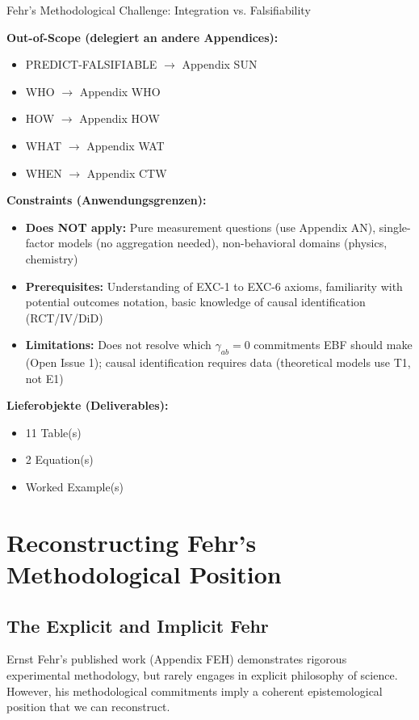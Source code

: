 \begin{chapter}{Fehr's Methodological Challenge: Integration vs. Falsifiability}
\begin{tcolorbox}[
    colback=orange!5!white,
    colframe=orange!75!black,
    title={\textbf{Appendix Scope: Ziel / In-Scope / Out-of-Scope / Constraints}},
    fonttitle=\bfseries
]
\textbf{Out-of-Scope (delegiert an andere Appendices):}
\begin{itemize}[nosep]
    \item PREDICT-FALSIFIABLE $\rightarrow$ Appendix SUN
    \item WHO $\rightarrow$ Appendix WHO
    \item HOW $\rightarrow$ Appendix HOW
    \item WHAT $\rightarrow$ Appendix WAT
    \item WHEN $\rightarrow$ Appendix CTW
\end{itemize}

\textbf{Constraints (Anwendungsgrenzen):}
\begin{itemize}[nosep]
    \item \textbf{Does NOT apply:} Pure measurement questions (use Appendix AN), single-factor models (no aggregation needed), non-behavioral domains (physics, chemistry)
    \item \textbf{Prerequisites:} Understanding of EXC-1 to EXC-6 axioms, familiarity with potential outcomes notation, basic knowledge of causal identification (RCT/IV/DiD)
    \item \textbf{Limitations:} Does not resolve which $\gamma_{ab} = 0$ commitments EBF should make (Open Issue 1); causal identification requires data (theoretical models use T1, not E1)
\end{itemize}

\textbf{Lieferobjekte (Deliverables):}
\begin{itemize}[nosep]
    \item 11 Table(s)
    \item 2 Equation(s)
    \item Worked Example(s)
\end{itemize}

\end{tcolorbox}


\section{Reconstructing Fehr's Methodological Position}
\label{sec:fehr-position}

\subsection{The Explicit and Implicit Fehr}

Ernst Fehr's published work (Appendix FEH) demonstrates rigorous experimental methodology, but rarely engages in explicit philosophy of science. However, his methodological commitments imply a coherent epistemological position that we can reconstruct.


\end{chapter}
